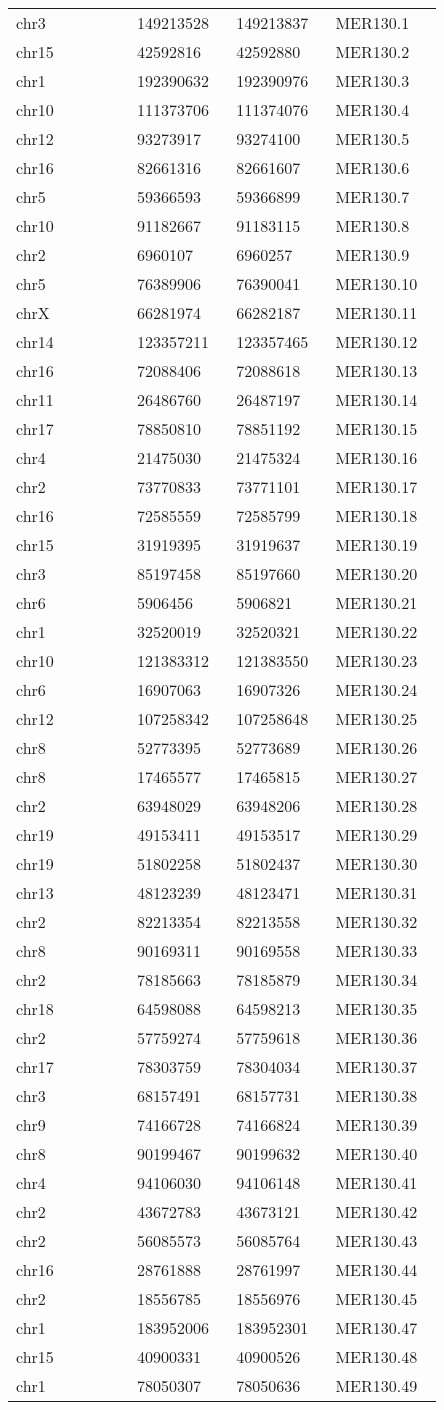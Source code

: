 \begin{center}
\begin{longtable}{@{}p{0.25\linewidth}p{0.2\linewidth}p{0.2\linewidth}p{0.2\linewidth}@{}}
chr3 & 149213528 & 149213837 & MER130.1\tabularnewline
chr15 & 42592816 & 42592880 & MER130.2\tabularnewline
chr1 & 192390632 & 192390976 & MER130.3\tabularnewline
chr10 & 111373706 & 111374076 & MER130.4\tabularnewline
chr12 & 93273917 & 93274100 & MER130.5\tabularnewline
chr16 & 82661316 & 82661607 & MER130.6\tabularnewline
chr5 & 59366593 & 59366899 & MER130.7\tabularnewline
chr10 & 91182667 & 91183115 & MER130.8\tabularnewline
chr2 & 6960107 & 6960257 & MER130.9\tabularnewline
chr5 & 76389906 & 76390041 & MER130.10\tabularnewline
chrX & 66281974 & 66282187 & MER130.11\tabularnewline
chr14 & 123357211 & 123357465 & MER130.12\tabularnewline
chr16 & 72088406 & 72088618 & MER130.13\tabularnewline
chr11 & 26486760 & 26487197 & MER130.14\tabularnewline
chr17 & 78850810 & 78851192 & MER130.15\tabularnewline
chr4 & 21475030 & 21475324 & MER130.16\tabularnewline
chr2 & 73770833 & 73771101 & MER130.17\tabularnewline
chr16 & 72585559 & 72585799 & MER130.18\tabularnewline
chr15 & 31919395 & 31919637 & MER130.19\tabularnewline
chr3 & 85197458 & 85197660 & MER130.20\tabularnewline
chr6 & 5906456 & 5906821 & MER130.21\tabularnewline
chr1 & 32520019 & 32520321 & MER130.22\tabularnewline
chr10 & 121383312 & 121383550 & MER130.23\tabularnewline
chr6 & 16907063 & 16907326 & MER130.24\tabularnewline
chr12 & 107258342 & 107258648 & MER130.25\tabularnewline
chr8 & 52773395 & 52773689 & MER130.26\tabularnewline
chr8 & 17465577 & 17465815 & MER130.27\tabularnewline
chr2 & 63948029 & 63948206 & MER130.28\tabularnewline
chr19 & 49153411 & 49153517 & MER130.29\tabularnewline
chr19 & 51802258 & 51802437 & MER130.30\tabularnewline
chr13 & 48123239 & 48123471 & MER130.31\tabularnewline
chr2 & 82213354 & 82213558 & MER130.32\tabularnewline
chr8 & 90169311 & 90169558 & MER130.33\tabularnewline
chr2 & 78185663 & 78185879 & MER130.34\tabularnewline
chr18 & 64598088 & 64598213 & MER130.35\tabularnewline
chr2 & 57759274 & 57759618 & MER130.36\tabularnewline
chr17 & 78303759 & 78304034 & MER130.37\tabularnewline
chr3 & 68157491 & 68157731 & MER130.38\tabularnewline
chr9 & 74166728 & 74166824 & MER130.39\tabularnewline
chr8 & 90199467 & 90199632 & MER130.40\tabularnewline
chr4 & 94106030 & 94106148 & MER130.41\tabularnewline
chr2 & 43672783 & 43673121 & MER130.42\tabularnewline
chr2 & 56085573 & 56085764 & MER130.43\tabularnewline
chr16 & 28761888 & 28761997 & MER130.44\tabularnewline
chr2 & 18556785 & 18556976 & MER130.45\tabularnewline
chr1 & 183952006 & 183952301 & MER130.47\tabularnewline
chr15 & 40900331 & 40900526 & MER130.48\tabularnewline
chr1 & 78050307 & 78050636 & MER130.49\tabularnewline

\end{longtable}
\end{center}
